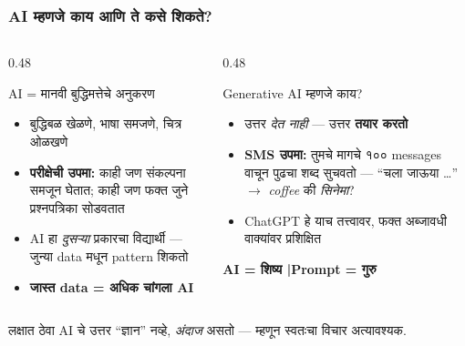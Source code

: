 \begin{frame}[fragile]\frametitle{AI म्हणजे काय आणि ते कसे शिकते?}

\begin{columns}[T]
\begin{column}{0.48\textwidth}
\begin{block}{AI = मानवी बुद्धिमत्तेचे अनुकरण}
\begin{itemize}
\item बुद्धिबळ खेळणे, भाषा समजणे, चित्र ओळखणे
\item \textbf{परीक्षेची उपमा:} काही जण संकल्पना समजून घेतात; काही जण फक्त जुने प्रश्नपत्रिका सोडवतात
\item AI हा \textit{दुसऱ्या} प्रकारचा विद्यार्थी — जुन्या data मधून pattern शिकतो
\item \textbf{जास्त data = अधिक चांगला AI}
\end{itemize}
\end{block}
\end{column}
\begin{column}{0.48\textwidth}
\begin{block}{Generative AI म्हणजे काय?}
\begin{itemize}
\item उत्तर \textit{देत नाही} — उत्तर \textbf{तयार करतो}
\item \textbf{SMS उपमा:} तुमचे मागचे १०० messages वाचून पुढचा शब्द सुचवतो — ``चला जाऊया \ldots'' $\rightarrow$ \textit{coffee} की \textit{सिनेमा}?
\item ChatGPT हे याच तत्त्वावर, फक्त अब्जावधी वाक्यांवर प्रशिक्षित
\end{itemize}
\vspace{0.1cm}
\textbf{AI = शिष्य \quad|\quad Prompt = गुरु}
\end{block}
\end{column}
\end{columns}

\vspace{0.2cm}
\begin{alertblock}{लक्षात ठेवा}
AI चे उत्तर ``ज्ञान'' नव्हे, \textit{अंदाज} असतो — म्हणून स्वतःचा विचार अत्यावश्यक.
\end{alertblock}


\end{frame}

